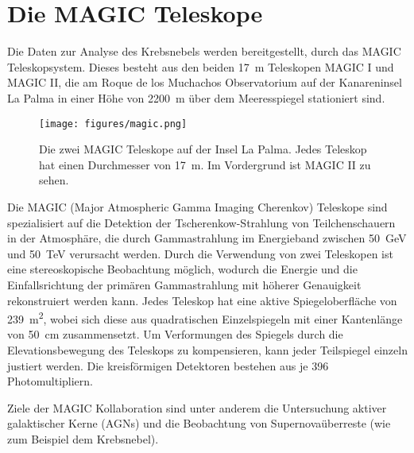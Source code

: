 \section{Die MAGIC Teleskope}
\label{sec:teleskop}

Die Daten zur Analyse des Krebsnebels werden bereitgestellt, durch das MAGIC
Teleskopsystem. Dieses besteht aus den beiden \SI{17}{\metre} Teleskopen MAGIC I
und MAGIC II, die am Roque de los Muchachos Observatorium auf der Kanareninsel
La Palma in einer Höhe von \SI{2200}{\metre} über dem Meeresspiegel stationiert
sind.

\begin{figure}
  \centering
  \texttt{[image: figures/magic.png]}
  \caption{Die zwei MAGIC Teleskope auf der Insel La Palma. Jedes Teleskop hat
  einen Durchmesser von \SI{17}{\metre}. Im Vordergrund ist MAGIC II zu sehen.}
  \label{fig:telescope}
\end{figure}

Die MAGIC (Major Atmospheric Gamma Imaging Cherenkov) Teleskope sind
spezialisiert auf die Detektion der Tscherenkow-Strahlung von Teilchenschauern
in der Atmosphäre, die durch Gammastrahlung im Energieband zwischen
\SI{50}{\giga\electronvolt} und \SI{50}{\tera\electronvolt} verursacht werden.
Durch die Verwendung von zwei Teleskopen ist eine stereoskopische Beobachtung
möglich, wodurch die Energie und die Einfallsrichtung der primären
Gammastrahlung mit höherer Genauigkeit rekonstruiert werden kann. Jedes Teleskop
hat eine aktive Spiegeloberfläche von \SI{239}{\metre\squared}, wobei sich diese
aus quadratischen Einzelspiegeln mit einer Kantenlänge von \SI{50}{\centi\metre}
zusammensetzt. Um Verformungen des Spiegels durch die Elevationsbewegung des
Teleskops zu kompensieren, kann jeder Teilspiegel einzeln justiert werden. Die
kreisförmigen Detektoren bestehen aus je 396 Photomultipliern.

Ziele der MAGIC Kollaboration sind unter anderem die Untersuchung aktiver
galaktischer Kerne (AGNs) und die Beobachtung von Supernovaüberreste (wie zum
Beispiel dem Krebsnebel).

